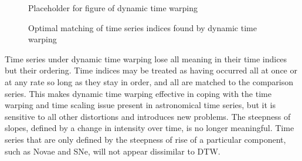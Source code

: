 \documentclass[10pt]{article}
\begin{document}
	\begin{figure}[ht!]
		\centering
		Placeholder for figure of dynamic time warping
		\caption{Optimal matching of time series indices found by dynamic time warping}
	\end{figure} 
	
	Time series under dynamic time warping lose all meaning in their time indices but their ordering. Time indices may be treated as having occurred all at once or at any rate so long as they stay in order, and all are matched to the comparison series. This makes dynamic time warping effective in coping with the time warping and time scaling issue present in astronomical time series, but it is sensitive to all other distortions and introduces new problems. The steepness of slopes, defined by a change in intensity over time, is no longer meaningful. Time series that are only defined by the steepness of rise of a particular component, such as Novae and SNe, will not appear dissimilar to DTW.
	
\end{document}
